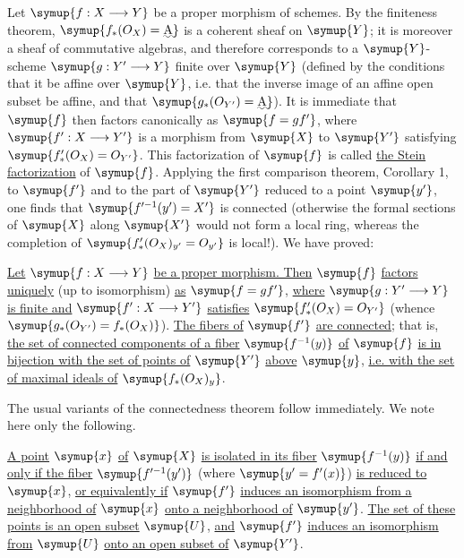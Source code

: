 
Let $\symup{f:X\longrightarrow Y}$ be a proper morphism of schemes. By the finiteness
theorem, $\symup{f_*(O_X)=\text{\uwave{A}}}$ is a coherent sheaf on $\symup{Y}$; it is moreover
a sheaf of commutative algebras, and therefore corresponds to a $\symup{Y}$-scheme
$\symup{g:Y'\longrightarrow Y}$ finite over $\symup{Y}$ (defined by the conditions that it be
affine over $\symup{Y}$, i.e. that the inverse image of an affine open subset be
affine, and that $\symup{g_*(O_{Y'})=\text{\uwave{A}}}$). It is immediate that $\symup{f}$ then
factors canonically as $\symup{f=gf'}$, where $\symup{f':X\longrightarrow Y'}$ is a morphism
from $\symup{X}$ to $\symup{Y'}$ satisfying $\symup{f'_*(O_X)=O_{Y'}}$. This factorization of
$\symup{f}$ is called \uline{the Stein factorization} of $\symup{f}$. Applying the first
comparison theorem, Corollary 1, to $\symup{f'}$ and to the part of $\symup{Y'}$ reduced to a
point $\symup{y'}$, one finds that $\symup{f'^{-1}(y')=X'}$ is connected (otherwise the formal
sections of $\symup{X}$ along $\symup{X'}$ would not form a local ring, whereas the completion
of $\symup{f'_*(O_X)_{y'}=O_{y'}}$ is local!). We have proved:

 \uline{Let}
$\symup{f:X\longrightarrow Y}$ \uline{be a proper morphism. Then} $\symup{f}$ \uline{factors uniquely} (up to
isomorphism) \uline{as} $\symup{f=gf'}$, \uline{where} $\symup{g:Y'\longrightarrow Y}$ \uline{is finite and}
$\symup{f':X\longrightarrow Y'}$ \uline{satisfies} $\symup{f'_*(O_X)=O_{Y'}}$ (whence
$\symup{g_*(O_{Y'})=f_*(O_X)}$). \uline{The fibers of} $\symup{f'}$ \uline{are connected}; 
that is, \uline{the
set of connected components of a fiber} $\symup{f^{-1}(y)}$ \uline{of} $\symup{f}$ \uline{is in bijection
with the set of points of} $\symup{Y'}$ \uline{above} $\symup{y}$, \uline{i.e. with the set of maximal ideals
of} $\symup{f_*(O_X)_y}$.

The usual variants of the connectedness theorem follow immediately. We note
here only the following.


 \uline{A point} $\symup{x}$ \uline{of} $\symup{X}$ \uline{is isolated in its fiber}
$\symup{f^{-1}(y)}$ \uline{if and only if the fiber} $\symup{f'^{-1}(y')}$ (where $\symup{y'=f'(x)}$) \uline{is
reduced to} $\symup{x}$, \uline{or equivalently if} $\symup{f'}$ \uline{induces an isomorphism from a
neighborhood of} $\symup{x}$ \uline{onto a neighborhood of} $\symup{y'}$. \uline{The set of these points is
an open subset} $\symup{U}$, \uline{and} $\symup{f'}$ \uline{induces an isomorphism from} $\symup{U}$ \uline{onto an open
subset of} $\symup{Y'}$.

